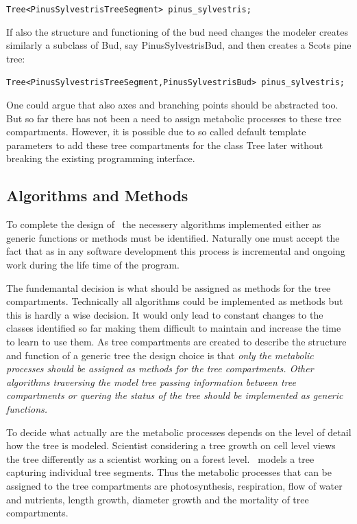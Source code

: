 \begin{center}
\tt Tree<PinusSylvestrisTreeSegment> pinus\_sylvestris;\rm
\end{center}

If also  the structure  and functioning of   the bud need  changes the
modeler creates similarly a subclass  of Bud, say  PinusSylvestrisBud,
and then creates a Scots pine tree:

\begin{center}
\tt Tree<PinusSylvestrisTreeSegment,PinusSylvestrisBud> pinus\_sylvestris;\rm
\end{center}

One could  argue  that  also axes   and  branching points  should be
abstracted too.  But so   far there has   not  been a need   to assign
metabolic   processes to  these  tree  compartments.   However, it  is
possible due to  so called  default  template parameters to add  these
tree    compartments for the class  Tree   later  without breaking the
existing programming interface.

\subsection{Algorithms and Methods}

To  complete the   design  of    \lignum\ the necessery     algorithms
implemented  either   as generic   functions     or methods must    be
identified. Naturally one must accept the fact that as in any software
development this  process is incremental and   ongoing work during the
life time of the program.

The fundemantal decision is what should be assigned as methods for the
tree compartments. Technically  all algorithms could be implemented as
methods but this is  hardly a wise decision.   It  would only lead  to
constant  changes  to  the  classes   identified  so far making   them
difficult to maintain and increase the time to learn  to use them.  As
tree compartments are created  to describe the structure  and function
of a  generic tree the design  choice  is that \it  only the metabolic
processes \rm should be assigned as methods for the tree compartments.
Other algorithms traversing the model tree passing information between
tree compartments or   quering  the  status  of the  tree  should   be
implemented as generic functions.

To decide what actually  are the  metabolic  processes depends  on the
level of detail how the tree is modeled.  Scientist considering a tree
growth on cell level views the tree differently as a scientist working
on a  forest level. \lignum\ models  a tree capturing  individual tree
segments.  Thus  the metabolic processes that can  be assigned  to the
tree  compartments are photosynthesis, respiration,  flow of water and
nutrients,  length growth, diameter growth  and  the mortality of tree
compartments.

